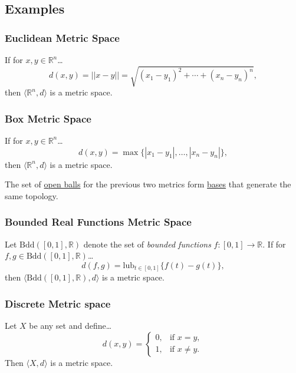 \subsection{Examples}\label{metricexamples}

\subsubsection{Euclidean Metric Space}\label{euclideanmetric}

If for $x,y \in \mathbb{R}^n$\dots
$$d(x,y) = ||x-y|| = \sqrt{(x_1 - y_1)^2 + \cdots + (x_n - y_n)^n},$$
then $\langle \mathbb{R}^n,d \rangle$ is a metric space.

\subsubsection{Box Metric Space}\label{euclideanmetric}

If for $x,y \in \mathbb{R}^n$\dots
$$d(x,y) = \max\{|x_1 - y_1|, \dots, |x_n - y_n|\},$$
then $\langle \mathbb{R}^n,d \rangle$ is a metric space.\newline

\noindent The set of \hyperref[metricopenball]{open balls} for the previous two metrics form \hyperref[basis]{bases} that generate the same topology.

\subsubsection{Bounded Real Functions Metric Space}\label{bddmetric}

Let $\textrm{Bdd}([0,1],\mathbb{R})$ denote the set of \emph{bounded functions} $f : [0,1] \rightarrow \mathbb{R}$. If for $f,g \in \textrm{Bdd}([0,1],\mathbb{R})$\dots
$$d(f,g) = \textrm{lub}_{t \in [0,1]}\{f(t) - g(t)\},$$
then $\langle \textrm{Bdd}([0,1],\mathbb{R}),d \rangle$ is a metric space.

\subsubsection{Discrete Metric space}\label{discretemetric}

Let $X$ be any set and define\dots
\[
	d(x,y) = \begin{cases}
				0, & \textrm{if } x = y,\\
				1, & \textrm{if } x \neq y.
			 \end{cases}
\]
Then $\langle X,d \rangle$ is a metric space.